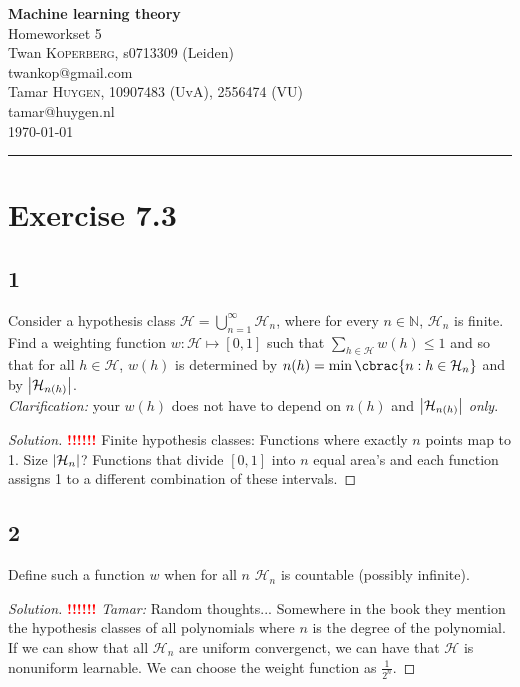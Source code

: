 \documentclass[10pt, a4paper, twoside]{amsart}
\makeatletter
\theoremstyle{plain}
\newcommand{\N}{\ensuremath{\mathbb{N}}}
\DeclarePairedDelimiter\abs{\lvert}{\rvert}
\DeclarePairedDelimiter\cbrac\{\}
\newcommand{\cH}{\ensuremath{\mathcal{H}}}
\newenvironment{solution}
               {\let\oldqedsymbol=\qedsymbol
                \renewcommand{\qedsymbol}{$\blacktriangleleft$}
                \begin{proof}[Solution]}
               {\end{proof}
                \renewcommand{\qedsymbol}{\oldqedsymbol}}
\newcommand{\TODO}{\textcolor{red}{\textbf{!!!!!! }}}
\newcommand{\firstName}  {Twan}
\newcommand{\lastName}   {Koperberg}
\newcommand{\studId}     {0713309 (Leiden)}
\renewcommand{\email}    {twankop@gmail.com}
\newcommand{\firstNameII}  {Tamar}
\newcommand{\lastNameII}   {Huygen}
\newcommand{\studIdII}     {10907483 (UvA)}
\newcommand{\studIdIII}    {2556474 (VU)}
\newcommand{\emailII}     {tamar@huygen.nl}
\makeatother
\begin{document}
\begin{center}

  {\huge\bf Machine learning theory}\\
  {\large\sc Homeworkset 5 }\\ \vspace{1em}
  \firstName \textsc{ \lastName}, {\sc s}\studId \\
  \email\text{}\\ \smallskip
  \firstNameII \textsc{ \lastNameII}, \studIdII, \studIdIII\\
  \emailII \\ \bigskip
  \today \\\bigskip
  \hrule
  \bigskip
\end{center}


 \section*{Exercise 7.3}
 \subsection*{1}
 Consider a hypothesis class $\cH = \bigcup_{n=1}^\infty \cH_n$, where for every $n \in \N$, $\cH_n$ is finite. Find a weighting function $w : \cH \mapsto [0,1]$ such that $\sum_{h \in \cH} w(h) \leq 1$ and so that for all $h \in \cH$, $w(h)$ is determined by $n(h) = \min \cbrac{n:h \in \cH_n}$ and by $\abs*{\cH_{n(h)}}$.\\
 \textit{Clarification:} your $w(h)$ does not have to depend on $n(h)$ and $\abs*{\cH_{n(h)}}$ \textit{only}.
\begin{solution}
  \TODO
  Finite hypothesis classes: Functions where exactly $n$ points map to 1. Size $\abs{\cH_n}$? Functions that divide $[0,1]$ into $n$ equal area's and each function assigns 1 to a different combination of these intervals. 
\end{solution}
\subsection*{2}
Define such a function $w$ when for all $n$ $\cH_n$ is countable (possibly infinite).
 \begin{solution}
   \TODO
   \textit{Tamar:} Random thoughts... Somewhere in the book they mention the hypothesis classes of all polynomials where $n$ is the degree of the polynomial. If we can show that all $\cH_n$ are uniform convergenct, we can have that $\cH$ is nonuniform learnable. We can choose the weight function as $\frac{1}{2^n}$.
 \end{solution}
 
\end{document}
